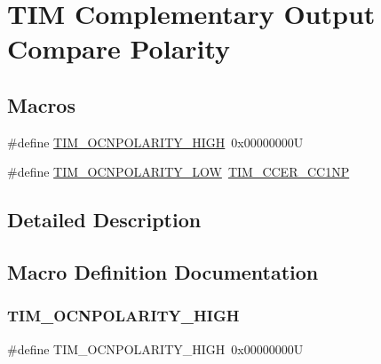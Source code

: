 \hypertarget{group___t_i_m___output___compare___n___polarity}{}\section{T\+IM Complementary Output Compare Polarity}
\label{group___t_i_m___output___compare___n___polarity}
\subsection*{Macros}
\begin{DoxyCompactItemize}
\item 
\#define \hyperlink{group___t_i_m___output___compare___n___polarity_gad5dbeb61519e4fd55db3a4d136e96316}{T\+I\+M\+\_\+\+O\+C\+N\+P\+O\+L\+A\+R\+I\+T\+Y\+\_\+\+H\+I\+GH}~0x00000000U
\item 
\#define \hyperlink{group___t_i_m___output___compare___n___polarity_gadb44419c891a58e2cde11cc016f71a14}{T\+I\+M\+\_\+\+O\+C\+N\+P\+O\+L\+A\+R\+I\+T\+Y\+\_\+\+L\+OW}~\hyperlink{group___peripheral___registers___bits___definition_ga403fc501d4d8de6cabee6b07acb81a36}{T\+I\+M\+\_\+\+C\+C\+E\+R\+\_\+\+C\+C1\+NP}
\end{DoxyCompactItemize}


\subsection{Detailed Description}


\subsection{Macro Definition Documentation}
\mbox{\label{group___t_i_m___output___compare___n___polarity_gad5dbeb61519e4fd55db3a4d136e96316}} 
\subsubsection{\texorpdfstring{T\+I\+M\+\_\+\+O\+C\+N\+P\+O\+L\+A\+R\+I\+T\+Y\+\_\+\+H\+I\+GH}{TIM\_OCNPOLARITY\_HIGH}}
{\footnotesize\ttfamily \#define T\+I\+M\+\_\+\+O\+C\+N\+P\+O\+L\+A\+R\+I\+T\+Y\+\_\+\+H\+I\+GH~0x00000000U}

